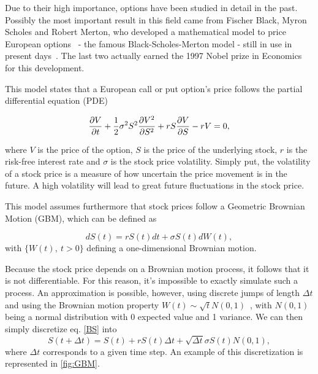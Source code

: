 \documentclass[a4paper,twocolumn,aps,prd,longbibliography,superscriptaddress]{revtex4-1}
\begin{document}
Due to their high importance, options have been studied in detail in the past.
Possibly the most important result in this field came from Fischer Black, Myron Scholes and Robert Merton, who developed a mathematical model to price European options~\cite{Scholes} - the famous Black-Scholes-Merton model - still in use in present days~\cite{Hull}. The last two actually earned the 1997 Nobel prize in Economics for this development.

This model states that a European call or put option's price follows the partial differential equation (PDE)

\begin{equation}\label{BS2}
\pdv{V}{t}+\frac{1}{2}\sigma^2S^2\pdv{V^2}{S^2}+rS\pdv{V}{S}-rV=0,
\end{equation}

\noindent where $V$ is the price of the option, $S$ is the price of the underlying stock, $r$ is the risk-free interest rate and $\sigma$ is the stock price volatility.
Simply put, the volatility of a stock price is a measure of how uncertain the price movement is in the future. A high volatility will lead to great future fluctuations in the stock price.

This model assumes furthermore that stock prices follow a Geometric Brownian Motion (GBM), which can be defined as

\begin{equation}\label{BS}
dS(t)=rS(t)dt+\sigma S(t)dW(t),
\end{equation}
\noindent with $\{W(t),\ t>0\}$ defining a one-dimensional Brownian motion.

Because the stock price depends on a Brownian motion process, it follows that it is not differentiable. For this reason, it's impossible to exactly simulate such a process. An approximation is possible, however, using discrete jumps of length $\Delta t$ and using the Brownian motion property $W(t)\sim \sqrt{t}N(0,1)$~\cite{Mikosch}, with $N(0,1)$ being a normal distribution with 0 expected value and 1 variance.
We can then simply discretize eq. \eqref{BS} into
\begin{equation}
S(t+\Delta t)=S(t)+rS(t)\Delta t+\sqrt{\Delta t}\sigma S(t)N(0,1),
\end{equation}
\noindent where $\Delta t$ corresponds to a given time step. An example of this discretization is represented in \autoref{fig:GBM}.
\end{document}
